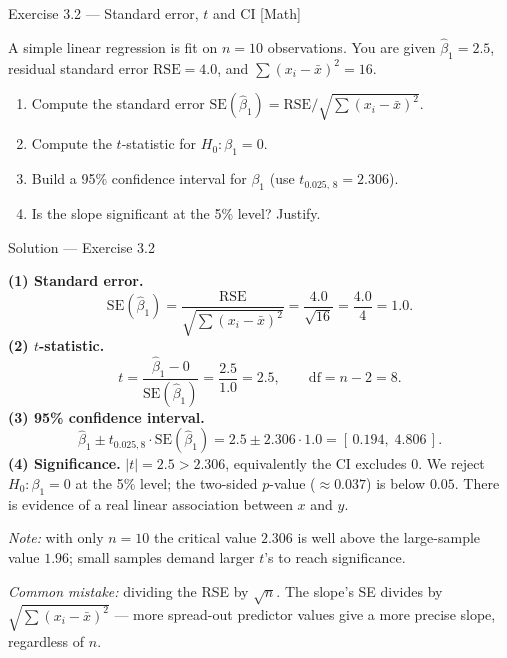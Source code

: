 \documentclass[aspectratio=169,11pt]{beamer}
\begin{document}
\begin{frame}{Exercise 3.2 --- Standard error, $t$ and CI [Math]}
  \begin{exercise}
    A simple linear regression is fit on $n=10$ observations. You are
    given $\hat\beta_1 = 2.5$, residual standard error
    $\mathrm{RSE}=4.0$, and $\sum(x_i-\bar x)^2 = 16$.
    \begin{enumerate}
      \item Compute the standard error
            $\mathrm{SE}(\hat\beta_1)=\mathrm{RSE}/\sqrt{\sum(x_i-\bar x)^2}$.
      \item Compute the $t$-statistic for $H_0:\beta_1=0$.
      \item Build a 95\% confidence interval for $\beta_1$
            (use $t_{0.025,\,8}=2.306$).
      \item Is the slope significant at the 5\% level? Justify.
    \end{enumerate}
  \end{exercise}
\end{frame}

\begin{frame}{Solution --- Exercise 3.2}
  \begin{solutionbox}
    \scriptsize
    \textbf{(1) Standard error.}
    \[
      \mathrm{SE}(\hat\beta_1)=\frac{\mathrm{RSE}}{\sqrt{\sum(x_i-\bar x)^2}}
        =\frac{4.0}{\sqrt{16}}=\frac{4.0}{4}=1.0.
    \]
    \textbf{(2) $t$-statistic.}
    \[
      t=\frac{\hat\beta_1-0}{\mathrm{SE}(\hat\beta_1)}
       =\frac{2.5}{1.0}=2.5,\qquad \text{df}=n-2=8.
    \]
    \textbf{(3) 95\% confidence interval.}
    \[
      \hat\beta_1 \pm t_{0.025,8}\cdot\mathrm{SE}(\hat\beta_1)
      = 2.5 \pm 2.306\cdot 1.0 = [\,0.194,\; 4.806\,].
    \]
    \textbf{(4) Significance.} $|t|=2.5 > 2.306$, equivalently the CI
    excludes $0$. We reject $H_0:\beta_1=0$ at the 5\% level; the
    two-sided $p$-value ($\approx 0.037$) is below $0.05$. There is
    evidence of a real linear association between $x$ and $y$.

    \medskip
    \textit{Note:} with only $n=10$ the critical value $2.306$ is well
    above the large-sample value $1.96$; small samples demand larger
    $t$'s to reach significance.

    \smallskip
    \textit{Common mistake:} dividing the RSE by $\sqrt n$. The slope's
    SE divides by $\sqrt{\sum(x_i-\bar x)^2}$ --- more spread-out
    predictor values give a more precise slope, regardless of $n$.
  \end{solutionbox}
\end{frame}
\end{document}
